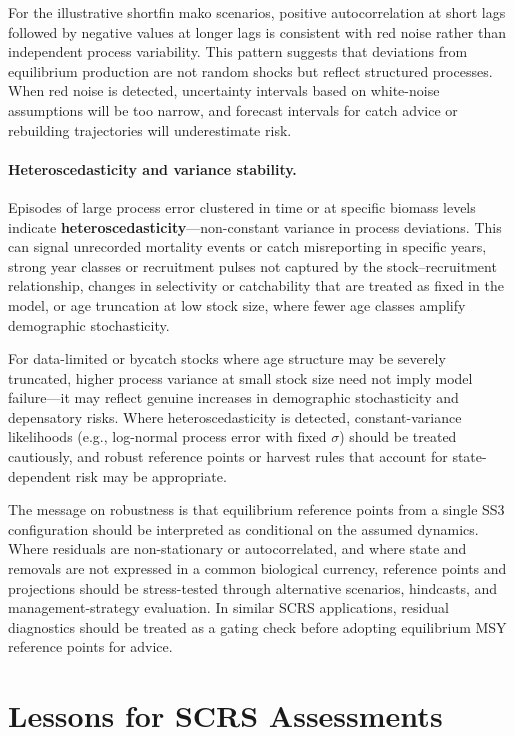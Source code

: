 \documentclass[11pt,a4paper]{article}
\begin{document}
For the illustrative shortfin mako scenarios, positive autocorrelation at short lags followed by negative values at longer lags is consistent with red noise rather than independent process variability. This pattern suggests that deviations from equilibrium production are not random shocks but reflect structured processes. When red noise is detected, uncertainty intervals based on white-noise assumptions will be too narrow, and forecast intervals for catch advice or rebuilding trajectories will underestimate risk.

\paragraph{Heteroscedasticity and variance stability.}

Episodes of large process error clustered in time or at specific biomass levels indicate \textbf{heteroscedasticity}---non-constant variance in process deviations. This can signal unrecorded mortality events or catch misreporting in specific years, strong year classes or recruitment pulses not captured by the stock--recruitment relationship, changes in selectivity or catchability that are treated as fixed in the model, or age truncation at low stock size, where fewer age classes amplify demographic stochasticity.

For data-limited or bycatch stocks where age structure may be severely truncated, higher process variance at small stock size need not imply model failure---it may reflect genuine increases in demographic stochasticity and depensatory risks. Where heteroscedasticity is detected, constant-variance likelihoods (e.g., log-normal process error with fixed $\sigma$) should be treated cautiously, and robust reference points or harvest rules that account for state-dependent risk may be appropriate.

The message on robustness is that equilibrium reference points from a single SS3 configuration should be interpreted as conditional on the assumed dynamics. Where residuals are non-stationary or autocorrelated, and where state and removals are not expressed in a common biological currency, reference points and projections should be stress-tested through alternative scenarios, hindcasts, and management-strategy evaluation. In similar SCRS applications, residual diagnostics should be treated as a gating check before adopting equilibrium MSY reference points for advice.

\section{Lessons for SCRS Assessments}
\end{document}
